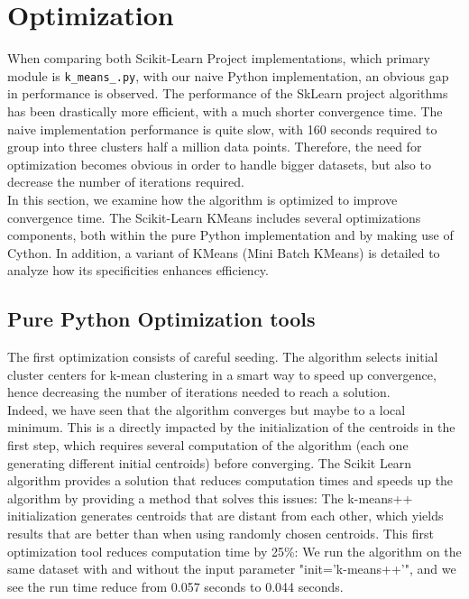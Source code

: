 \documentclass[11pt]{article}
\begin{document}
\section*{Optimization}
When comparing both Scikit-Learn Project implementations, which primary module is \verb|k_means_.py|, with our naive Python implementation, an obvious gap in performance is observed. The performance of the SkLearn project algorithms has been drastically more efficient, with a much shorter convergence time.  The naive implementation performance is quite slow, with 160 seconds required to group into three clusters half a million data points. Therefore, the need for optimization becomes obvious in order to handle bigger datasets, but also to decrease the number of iterations required. \\

\noindent In this section, we examine how the algorithm is optimized to improve convergence time. The Scikit-Learn KMeans includes several optimizations components, both within the pure Python implementation and by making use of Cython. In addition, a variant of KMeans (Mini Batch KMeans) is detailed to analyze how its specificities enhances efficiency.  

\subsection*{Pure Python Optimization tools}
The first optimization consists of careful seeding. The algorithm selects initial cluster centers for k-mean clustering in a smart way to speed up convergence, hence decreasing the number of iterations needed to reach a solution. \\

\noindent Indeed, we have seen that the algorithm converges but maybe to a local minimum. This is a directly impacted by the initialization of the centroids in the first step, which requires several computation of the algorithm (each one generating different initial centroids) before converging. The Scikit Learn algorithm provides a solution that reduces computation times and speeds up the algorithm by providing a method that solves this issues: The k-means++ initialization generates centroids that are distant from each other, which yields results that are better than when using randomly chosen centroids. This first optimization tool reduces computation time by 25\%: We run the algorithm on the same dataset with and without the input parameter "init='k-means++'", and we see the run time reduce from 0.057 seconds to 0.044 seconds. \\
\end{document}
